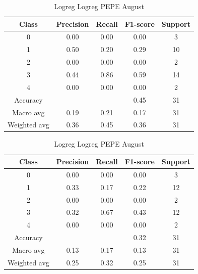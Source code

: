 \begin{enumerate}
\begin{enumerate}
            \begin{table}[H]
            \centering
            \scriptsize
            \begin{minipage}{0.48\textwidth}
            \centering
            \begin{tabular}{c|cccc}
            \hline
            Class & Precision & Recall & F1-score & Support \\
            \hline
            0 & 0.00 & 0.00 & 0.00 & 3 \\
            1 & 0.50 & 0.20 & 0.29 & 10 \\
            2 & 0.00 & 0.00 & 0.00 & 2 \\
            3 & 0.44 & 0.86 & 0.59 & 14 \\
            4 & 0.00 & 0.00 & 0.00 & 2 \\
            \hline
            Accuracy &       &      & 0.45 & 31\\
            Macro avg & 0.19 & 0.21 & 0.17 & 31 \\
            Weighted avg & 0.36 & 0.45 & 0.36 & 31 \\
            \hline
            \end{tabular}
            \caption{Logreg Logreg DOGE August}
            \label{tab:classifier_2_report_logreg_logreg_doge_filtered_aug}
            \end{minipage}
            \hfill
            \begin{minipage}{0.48\textwidth}
            \centering
            \begin{tabular}{c|cccc}
            \hline
            Class & Precision & Recall & F1-score & Support \\
            \hline
            0 & 0.00 & 0.00 & 0.00 & 3 \\
            1 & 0.33 & 0.17 & 0.22 & 12 \\
            2 & 0.00 & 0.00 & 0.00 & 2 \\
            3 & 0.32 & 0.67 & 0.43 & 12 \\
            4 & 0.00 & 0.00 & 0.00 & 2 \\
            \hline
            Accuracy &       &      & 0.32 & 31 \\
            Macro avg & 0.13 & 0.17 & 0.13 & 31 \\
            Weighted avg & 0.25 & 0.32 & 0.25 & 31 \\
            \hline
            \end{tabular}
            \caption{Logreg Logreg PEPE August}
            \label{tab:classifier_2_report_logreg_logreg_pepe_filtered_aug}
            \end{minipage}
            

\end{table}
\end{enumerate}
\end{enumerate}
